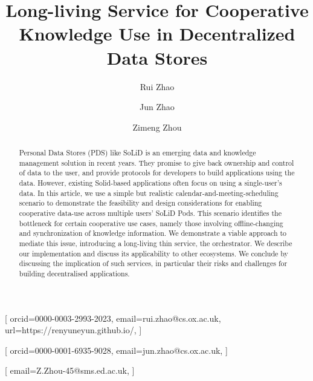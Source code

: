 \documentclass[
twocolumn,
]{ceurart}
\begin{document}


\title{Long-living Service for Cooperative Knowledge Use in Decentralized Data Stores}




\author[1]{Rui Zhao}[%
orcid=0000-0003-2993-2023,
email=rui.zhao@cs.ox.ac.uk,
url=https://renyuneyun.github.io/,
]
\address[1]{University of Oxford,
  Oxford, OX1 2JD, United Kingdom}

\author[1]{Jun Zhao}[%
orcid=0000-0001-6935-9028,
email=jun.zhao@cs.ox.ac.uk,
]

\author[2]{Zimeng Zhou}[%
email=Z.Zhou-45@sms.ed.ac.uk,
]
\address[2]{University of Edinburgh,
  Edinburgh, EH8 9YL, United Kingdom}




\begin{abstract}
  Personal Data Stores (PDS) like SoLiD is an emerging data and knowledge management solution in recent years. They promise to give back ownership and control of data to the user, and provide protocols for developers to build applications using the data. However, existing Solid-based applications often focus on using a single-user's data. In this article, we use a simple but realistic calendar-and-meeting-scheduling scenario to demonstrate the feasibility and design considerations for enabling cooperative data-use across multiple users' SoLiD Pods. This scenario identifies the bottleneck for certain cooperative use cases, namely those involving offline-changing and synchronization of knowledge information. We demonstrate a viable approach to mediate this issue, introducing a long-living thin service, the orchestrator. We describe our implementation and discuss its applicability to other ecosystems. We conclude by discussing the implication of such services, in particular their risks and challenges for building decentralised applications.
\end{abstract}
\end{document}
